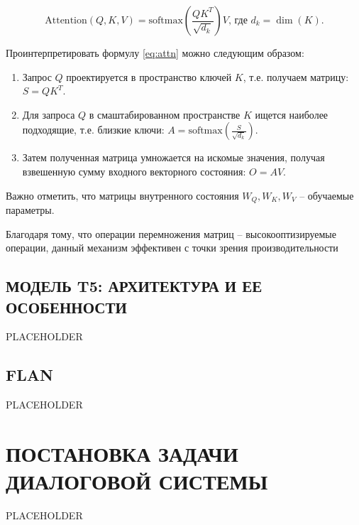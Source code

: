 \begin{equation}
    \text{Attention}\left(Q,K,V\right) = \text{softmax}\left(\frac{QK^T}{\sqrt{d_k}}\right)V\text{, где }d_k = \dim(K).
    \label{eq:attn}
\end{equation}

Проинтерпретировать формулу \ref{eq:attn} можно следующим образом:

\begin{enumerate}
    \item Запрос $Q$ проектируется в пространство ключей $K$, т.е. получаем матрицу: $S = QK^T$.
    \item Для запроса $Q$ в смаштабированном пространстве $K$ ищется наиболее подходящие, т.е. близкие ключи: $A=\text{softmax}\left(\frac{S}{\sqrt{d_k}}\right)$.
    \item Затем полученная матрица умножается на искомые значения, получая взвешенную сумму входного векторного состояния: $O=AV$.
\end{enumerate}

Важно отметить, что матрицы внутренного состояния $W_Q,W_K,W_V$ -- обучаемые параметры.

Благодаря тому, что операции перемножения матриц -- высокооптизируемые операции, данный механизм эффективен с точки зрения производительности

\subsection{МОДЕЛЬ T5: АРХИТЕКТУРА И ЕЕ ОСОБЕННОСТИ}
PLACEHOLDER

\subsection{FLAN}
PLACEHOLDER

\section{ПОСТАНОВКА ЗАДАЧИ ДИАЛОГОВОЙ СИСТЕМЫ}
PLACEHOLDER